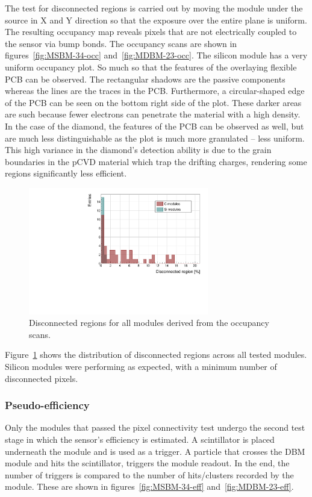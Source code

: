 The test for disconnected regions is carried out by moving the module under the source in X and Y direction so that the exposure over the entire plane is uniform. The resulting occupancy map reveals pixels that are not electrically coupled to the sensor via bump bonds. The occupancy scans are shown in figures~\ref{fig:MSBM-34-occ} and~\ref{fig:MDBM-23-occ}. The silicon module has a very uniform occupancy plot. So much so that the features of the overlaying flexible PCB can be observed. The rectangular shadows are the passive components whereas the lines are the traces in the PCB. Furthermore, a circular-shaped edge of the PCB can be seen on the bottom right side of the plot. These darker areas are such because fewer electrons can penetrate the material with a high density. In the case of the diamond, the features of the PCB can be observed as well, but are much less distinguishable as the plot is much more granulated -- less uniform. This high variance in the diamond's detection ability is due to the grain boundaries in the pCVD material which trap the drifting charges, rendering some regions significantly less efficient. 


\begin{figure}[!t]
\centering
\includegraphics[width=0.7\textwidth]{../scripts/04_charge_monitoring/plots/disconnectedregion1} \caption{Disconnected regions for all modules derived from the occupancy scans.}
\label{fig:disconreg}
\end{figure}

Figure~\ref{fig:disconreg} shows the distribution of disconnected regions across all tested modules. Silicon modules were performing as expected, with a minimum number of disconnected pixels.




\subsubsection{Pseudo-efficiency}
Only the modules that passed the pixel connectivity test undergo the second test stage in which the sensor's efficiency is estimated. A scintillator is placed underneath the module and is used as a trigger. A particle that crosses the DBM module and hits the scintillator, triggers the module readout. In the end, the number of triggers is compared to the number of hits/clusters recorded by the module. These are shown in figures~\ref{fig:MSBM-34-eff} and~\ref{fig:MDBM-23-eff}. 

